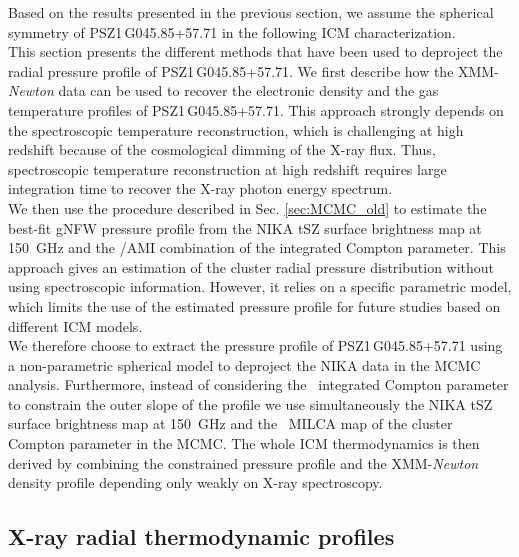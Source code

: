 \documentclass[traditabstract]{aa}
\begin{document}
Based on the results presented in the previous section, we assume the spherical symmetry of \mbox{PSZ1\,G045.85+57.71} in the following ICM characterization.\\
This section presents the different methods that have been used to deproject the radial pressure profile of \mbox{PSZ1\,G045.85+57.71}. We first describe how the XMM-{\it Newton} data can be used to recover the electronic density and the gas temperature profiles of \mbox{PSZ1\,G045.85+57.71}. This approach strongly depends on the spectroscopic temperature reconstruction, which is challenging at high redshift because of the cosmological dimming of the X-ray flux. Thus, spectroscopic temperature reconstruction at high redshift requires large integration time to recover the X-ray photon energy spectrum.\\
\indent We then use the procedure described in Sec. \ref{sec:MCMC_old} to estimate the best-fit gNFW pressure profile from the NIKA tSZ surface brightness map at 150~GHz and the \planck/AMI combination of the integrated Compton parameter. This approach gives an estimation of the cluster radial pressure distribution without using spectroscopic information. However, it relies on a specific parametric model, which limits the use of the estimated pressure profile for future studies based on different ICM models.\\
\indent We therefore choose to extract the pressure profile of \mbox{PSZ1\,G045.85+57.71} using a non-parametric spherical model to deproject the NIKA data in the MCMC analysis. Furthermore, instead of considering the \planck\ integrated Compton parameter to constrain the outer slope of the profile we use simultaneously the NIKA tSZ surface brightness map at 150~GHz and the \planck\ MILCA map of the cluster Compton parameter in the MCMC. The whole ICM thermodynamics is then derived by combining the constrained pressure profile and the XMM-{\it Newton} density profile depending only weakly on X-ray spectroscopy.

\subsection{X-ray radial thermodynamic profiles}\label{sec:X_ray_profiles}
\end{document}
